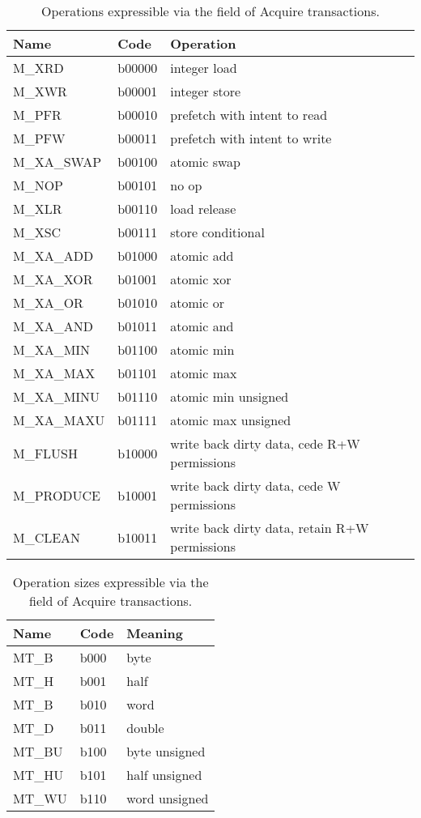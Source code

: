 \label{a.memopcodes}

\begin{table}
\centering
\begin{tabular}{|l|l|l|}
\hline
Name  & Code & Operation \\ \hline \hline
M\_XRD      & b00000 & integer load \\ \hline 
M\_XWR      & b00001 & integer store \\ \hline 
M\_PFR      & b00010 & prefetch with intent to read \\ \hline 
M\_PFW      & b00011 & prefetch with intent to write \\ \hline 
M\_XA\_SWAP & b00100 & atomic swap \\ \hline 
M\_NOP      & b00101 & no op \\ \hline 
M\_XLR      & b00110 & load release \\ \hline 
M\_XSC      & b00111 & store conditional \\ \hline 
M\_XA\_ADD  & b01000 & atomic add \\ \hline 
M\_XA\_XOR  & b01001 & atomic xor \\ \hline 
M\_XA\_OR   & b01010 & atomic or \\ \hline 
M\_XA\_AND  & b01011 & atomic and \\ \hline 
M\_XA\_MIN  & b01100 & atomic min \\ \hline 
M\_XA\_MAX  & b01101 & atomic max \\ \hline 
M\_XA\_MINU & b01110 & atomic min unsigned \\ \hline 
M\_XA\_MAXU & b01111 & atomic max unsigned \\ \hline 
M\_FLUSH    & b10000 & write back dirty data, cede R+W permissions \\ \hline 
M\_PRODUCE  & b10001 & write back dirty data, cede W permissions \\ \hline 
M\_CLEAN    & b10011 & write back dirty data, retain R+W permissions \\ \hline
\end{tabular}
\caption{Operations expressible via the  field of Acquire transactions.}
\label{tab:opcodes}
\end{table}

\begin{table}
\centering
\begin{tabular}{|l|l|l|}
\hline
Name  & Code & Meaning \\ \hline \hline
MT\_B & b000 & byte \\ \hline
MT\_H & b001 & half \\ \hline
MT\_B & b010 & word \\ \hline
MT\_D & b011 & double \\ \hline
MT\_BU & b100 & byte unsigned \\ \hline
MT\_HU & b101 & half unsigned \\ \hline
MT\_WU & b110 & word unsigned \\ \hline
\end{tabular}
\caption{Operation sizes expressible via the  field of Acquire transactions.}
\label{tab:opsizes}
\end{table}

